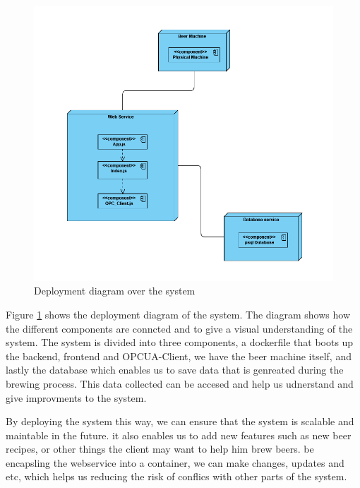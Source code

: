 \begin{center}
    \centering
    \begin{figure}[H]
        \includegraphics[width=1\textwidth]{img/Deployment_diagram.png}
        \caption{Deployment diagram over the system}
        \label{fig:Deployment_diagram}
    \end{figure}
\end{center}
Figure \ref{fig:Deployment_diagram} shows the deployment diagram of the system. The diagram shows how the different components are conncted and to give a visual understanding of the system. The system is divided into three components, a dockerfile that boots up the backend, frontend and OPCUA-Client, we have the beer machine itself, and lastly the database which enables us to save data that is genreated during the brewing process. This data collected can be accesed and help us udnerstand and give improvments to the system. \newline

By deploying the system this way, we can ensure that the system is scalable and maintable in the future. it also enables us to add new features such as new beer recipes, or other things the client may want to help him brew beers. be encapsling the webservice into a container, we can make changes, updates and etc, which helps us reducing the risk of conflics with other parts of the system. \newline

